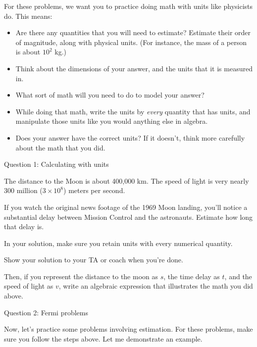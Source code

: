 \documentclass[12pt]{article}
\newcommand{\BI}{\begin{itemize}}
\newcommand{\EI}{\end{itemize}}
\begin{document}
\Large
\centerline{}
\normalsize
\centerline{}

\medskip

For these problems, we want you to practice doing math with units like physicists do. This means:

\BI
\item Are there any quantities that you will need to estimate? Estimate their order of magnitude, along with physical units. (For instance, the mass of a person is about $10^2$ kg.)
\item Think about the dimensions of your answer, and the units that it is measured in.
\item What sort of math will you need to do to model your answer?
\item While doing that math, write the units by {\it every} quantity that has units, and manipulate those units like you would anything else in algebra.
\item Does your answer have the correct units? If it doesn't, think more carefully about the math that you did. 
\EI

\centerline{\Large Question 1: Calculating with units}

The distance to the Moon is about 400,000 km. The speed of light is very nearly 300 million ($3 \times 10^8$) meters per second.

If you watch the original news footage of the 1969 Moon landing, you'll notice a substantial delay between Mission Control and the astronauts. Estimate how long that delay is.

In your solution, make sure you retain units with every numerical quantity.

\vspace{3in}

Show your solution to your TA or coach when you're done.

Then, if you represent the distance to the moon as $s$, the time delay as $t$, and the speed of light as $v$, write an algebraic expression that illustrates the math you did above.

\vspace{2in}

\newpage

\centerline{\Large Question 2: Fermi problems}

Now, let's practice some problems involving estimation. For these problems, make sure you follow the steps above. Let me demonstrate an example.
\end{document}
